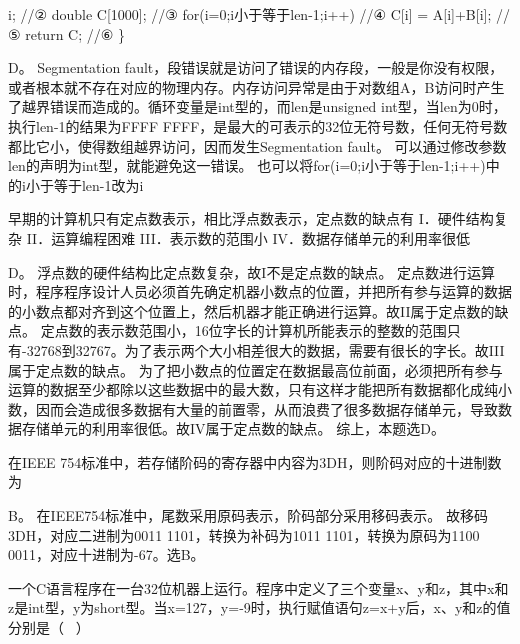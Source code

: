 i; //② double C{[}1000{]}; //③ for(i=0;i小于等于len-1;i++) //④ C{[}i{]}
= A{[}i{]}+B{[}i{]}; //⑤ return C; //⑥ \}
\par{}
\begin{solution}D。 Segmentation
fault，段错误就是访问了错误的内存段，一般是你没有权限，或者根本就不存在对应的物理内存。内存访问异常是由于对数组A，B访问时产生了越界错误而造成的。循环变量是int型的，而len是unsigned
int型，当len为0时，执行len-1的结果为FFFF
FFFF，是最大的可表示的32位无符号数，任何无符号数都比它小，使得数组越界访问，因而发生Segmentation
fault。 可以通过修改参数len的声明为int型，就能避免这一错误。
也可以将for(i=0;i小于等于len-1;i++)中的i小于等于len-1改为i
\end{solution}
\question 早期的计算机只有定点数表示，相比浮点数表示，定点数的缺点有
I．硬件结构复杂 II．运算编程困难 III．表示数的范围小
IV．数据存储单元的利用率很低
\par{}
\begin{solution}D。 浮点数的硬件结构比定点数复杂，故I不是定点数的缺点。
定点数进行运算时，程序程序设计人员必须首先确定机器小数点的位置，并把所有参与运算的数据的小数点都对齐到这个位置上，然后机器才能正确进行运算。故II属于定点数的缺点。
定点数的表示数范围小，16位字长的计算机所能表示的整数的范围只有-32768到32767。为了表示两个大小相差很大的数据，需要有很长的字长。故III属于定点数的缺点。
为了把小数点的位置定在数据最高位前面，必须把所有参与运算的数据至少都除以这些数据中的最大数，只有这样才能把所有数据都化成纯小数，因而会造成很多数据有大量的前置零，从而浪费了很多数据存储单元，导致数据存储单元的利用率很低。故IV属于定点数的缺点。
综上，本题选D。
\end{solution}
\question 在IEEE 754标准中，若存储阶码的寄存器中内容为3DH，则阶码对应的十进制数为
\par{}
\begin{solution}B。 在IEEE754标准中，尾数采用原码表示，阶码部分采用移码表示。
故移码3DH，对应二进制为0011 1101，转换为补码为1011
1101，转换为原码为1100 0011，对应十进制为-67。选B。
\end{solution}
\question 一个C语言程序在一台32位机器上运行。程序中定义了三个变量x、y和z，其中x和z是int型，y为short型。当x=127，y=-9时，执行赋值语句z=x+y后，x、y和z的值分别是（
~）
\par{}
